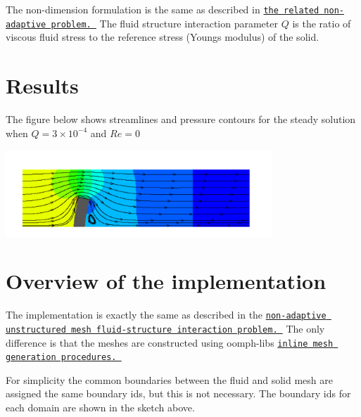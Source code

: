 The non-\/dimension formulation is the same as described in \href{../../unstructured_fsi/html/index.html}{\tt the related non-\/adaptive problem. } The fluid structure interaction parameter $Q $ is the ratio of viscous fluid stress to the reference stress (Young\textquotesingle{}s modulus) of the solid.



 

\hypertarget{index_results}{}\section{Results}\label{index_results}
The figure below shows streamlines and pressure contours for the steady solution when $Q = 3\times 10^{-4} $ and $ Re = 0 $

 
\begin{DoxyImage}
\includegraphics[width=0.75\textwidth]{res}
\end{DoxyImage}




 

\hypertarget{index_overview_implementation}{}\section{Overview of the implementation}\label{index_overview_implementation}
The implementation is exactly the same as described in the \href{../../unstructured_fsi/html/index.html}{\tt non-\/adaptive unstructured mesh fluid-\/structure interaction problem. } The only difference is that the meshes are constructed using {\ttfamily oomph-\/lib\textquotesingle{}s} \href{../../../meshes/mesh_from_inline_triangle/html/index.html}{\tt inline mesh generation procedures. }

For simplicity the common boundaries between the fluid and solid mesh are assigned the same boundary ids, but this is not necessary. The boundary ids for each domain are shown in the sketch above.



 

